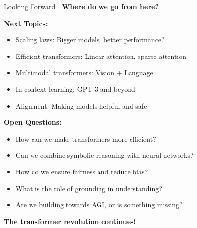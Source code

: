 \documentclass[aspectratio=169]{beamer}
\begin{document}
\begin{frame}[shrink=10]{Looking Forward 🔮}
\textbf{Where do we go from here?}

\vspace{1em}

\textbf{Next Topics:}
\begin{itemize}\setlength{\itemsep}{0pt}
    \item Scaling laws: Bigger models, better performance?
    \item Efficient transformers: Linear attention, sparse attention
    \item Multimodal transformers: Vision + Language
    \item In-context learning: GPT-3 and beyond
    \item Alignment: Making models helpful and safe
\end{itemize}

\vspace{1em}

\textbf{Open Questions:}
\begin{itemize}\setlength{\itemsep}{0pt}
    \item How can we make transformers more efficient?
    \item Can we combine symbolic reasoning with neural networks?
    \item How do we ensure fairness and reduce bias?
    \item What is the role of grounding in understanding?
    \item Are we building towards AGI, or is something missing?
\end{itemize}

\vspace{1em}

\begin{center}
\Large
\textbf{The transformer revolution continues! 🚀}
\end{center}
\end{frame}
\end{document}
